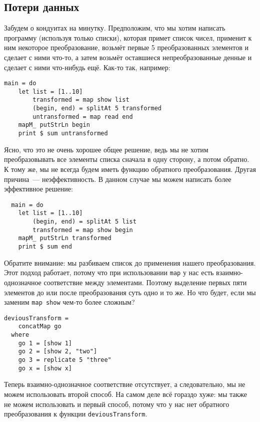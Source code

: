 \subsection{Потери данных}
Забудем о кондуитах на минутку. Предположим, что мы хотим написать программу (используя
только списки), которая примет список чисел, применит к ним некоторое преобразование,
возьмёт первые 5 преобразованных элементов и сделает с ними что-то, а затем возьмёт оставшиеся
непреобразованные денные и сделает с ними что-нибудь ещё. Как-то так, например:
\begin{lstlisting}
main = do
    let list = [1..10]
        transformed = map show list
        (begin, end) = splitAt 5 transformed
        untransformed = map read end
    mapM_ putStrLn begin
    print $ sum untransformed
\end{lstlisting}
Ясно, что это не очень хорошее общее решение, ведь мы не хотим
преобразовывать все элементы списка сначала в одну сторону, а потом обратно. К тому же,
мы не всегда будем иметь функцию обратного преобразования. Другая причина~---
неэффективность. В данном случае мы можем написать более эффективное решение:
\begin{lstlisting}
  main = do
    let list = [1..10]
        (begin, end) = splitAt 5 list
        transformed = map show begin
    mapM_ putStrLn transformed
    print $ sum end
\end{lstlisting}
Обратите внимание: мы разбиваем список до применения нашего преобразования.
Этот подход работает, потому что при использовании \lstinline'map' у нас есть
 взаимно-однозначное соответствие между элементами. Поэтому выделение первых пяти
 элементов до или после преобразования суть одно и то же. Но что будет, если мы
 заменим \lstinline'map show' чем-то более сложным?
\begin{lstlisting}
deviousTransform =
    concatMap go
  where
    go 1 = [show 1]
    go 2 = [show 2, "two"]
    go 3 = replicate 5 "three"
    go x = [show x]
\end{lstlisting}
Теперь взаимно-однозначное соответствие отсутствует, а следовательно, мы не можем
использовать второй способ. На самом деле всё гораздо хуже: мы также не можем
использовать и первый способ, потому что у нас нет обратного преобразования к
функции \lstinline'deviousTransform'.

